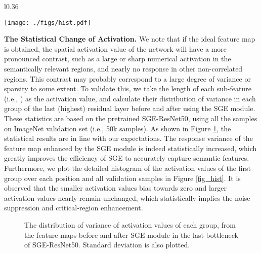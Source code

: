 \documentclass{article}
\begin{document}
	\begin{wrapfigure}{l}{0.36\textwidth}
		\vspace{-16pt}
		\begin{center}
			\texttt{[image: ./figs/hist.pdf]}
		\end{center}
		\vspace{-12pt}	
		\caption{Histogram of activations.}
		\label{fig_hist}
		\vspace{-12pt}
	\end{wrapfigure}
	
	\textbf{The Statistical Change of Activation.} We note that if the ideal feature map is obtained, the spatial activation value of the network will have a more pronounced contrast, such as a large or sharp numerical activation in the semantically relevant regions, and nearly no response in other non-correlated regions. This contrast may probably correspond to a large degree of variance or sparsity to some extent. To validate this, we take the length of each sub-feature (i.e., ) as the activation value, and calculate their distribution of variance in each group of the last (highest) residual layer before and after using the SGE module. These statistics are based on the pretrained SGE-ResNet50, using all the samples on ImageNet validation set (i.e., 50k samples). As shown in Figure \ref{fig_vd}, the statistical results are in line with our expectations. The response variance of the feature map enhanced by the SGE module is indeed statistically increased, which greatly improves the efficiency of SGE to accurately capture semantic features. Furthermore, we plot the detailed histogram of the activation values of the first group over each position and all validation samples in Figure \ref{fig_hist}. It is observed that the smaller activation values bias towards zero and larger activation values nearly remain unchanged, which statistically implies the noise suppression and critical-region enhancement.
	

	
	\begin{figure}[t]
		\begin{center}
			\setlength{\fboxrule}{0pt}
		\end{center}	
		\vspace{-14pt}
		\caption{The distribution of variance of activation values of each group, from the feature maps before and after SGE module in the last bottleneck of SGE-ResNet50. Standard deviation is also plotted.}
		\label{fig_vd}
		\vspace{-12pt}
	\end{figure}
	
\end{document}
